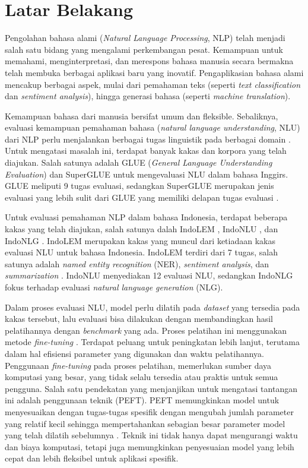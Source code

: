 \section{Latar Belakang}
\label{sec:latar-belakang}

Pengolahan bahasa alami (\textit{Natural Language Processing}, NLP) telah menjadi salah satu bidang yang mengalami perkembangan pesat. Kemampuan untuk memahami, menginterpretasi, dan merespons bahasa manusia secara bermakna telah membuka berbagai aplikasi baru yang inovatif. Pengaplikasian bahasa alami mencakup berbagai aspek, mulai dari pemahaman teks (seperti \textit{text classification} dan \textit{sentiment analysis}), hingga generasi bahasa (seperti \textit{machine translation}).

Kemampuan bahasa dari manusia bersifat umum dan fleksible. Sebaliknya, evaluasi kemampuan pemahaman bahasa (\textit{natural language understanding}, NLU) dari NLP perlu menjalankan berbagai tugas linguistik pada berbagai domain \parencite{glue}. Untuk mengatasi masalah ini, terdapat banyak kakas dan korpora yang telah diajukan. Salah satunya adalah GLUE (\textit{General Language Understanding Evaluation}) \parencite{glue} dan SuperGLUE \parencite{superglue} untuk mengevaluasi NLU dalam bahasa Inggirs. GLUE meliputi 9 tugas evaluasi, sedangkan SuperGLUE merupakan jenis evaluasi yang lebih sulit dari GLUE yang memiliki delapan tugas evaluasi \parencite{indolem}.

Untuk evaluasi pemahaman NLP dalam bahasa Indonesia, terdapat beberapa kakas yang telah diajukan, salah satunya dalah IndoLEM \parencite{indolem}, IndoNLU \parencite{indonlu}, dan IndoNLG \parencite{indonlg}. IndoLEM merupakan kakas yang muncul dari ketiadaan kakas evaluasi NLU untuk bahasa Indonesia. IndoLEM terdiri dari 7 tugas, salah satunya adalah \textit{named entity recognition} (NER), \textit{sentiment analysis}, dan \textit{summarization} \parencite{indolem}. IndoNLU menyediakan 12 evaluasi NLU, sedangkan IndoNLG fokus terhadap evaluasi \textit{natural language generation} (NLG).

Dalam proses evaluasi NLU, model perlu dilatih pada \textit{dataset} yang tersedia pada kakas tersebut, lalu evaluasi bisa dilakukan dengan membandingkan hasil pelatihannya dengan \textit{benchmark} yang ada. Proses pelatihan ini menggunakan metode \textit{fine-tuning} \parencite{indolem}. Terdapat peluang untuk peningkatan lebih lanjut, terutama dalam hal efisiensi parameter yang digunakan dan waktu pelatihannya. Penggunaan \textit{fine-tuning} pada proses pelatihan, memerlukan sumber daya komputasi yang besar, yang tidak selalu tersedia atau praktis untuk semua pengguna. Salah satu pendekatan yang menjanjikan untuk mengatasi tantangan ini adalah penggunaan teknik \PEFT (PEFT). PEFT memungkinkan model untuk menyesuaikan dengan tugas-tugas spesifik dengan mengubah jumlah parameter yang relatif kecil sehingga mempertahankan sebagian besar parameter model yang telah dilatih sebelumnya \parencite{adapter}. Teknik ini tidak hanya dapat mengurangi waktu dan biaya komputasi, tetapi juga memungkinkan penyesuaian model yang lebih cepat dan lebih fleksibel untuk aplikasi spesifik. 

